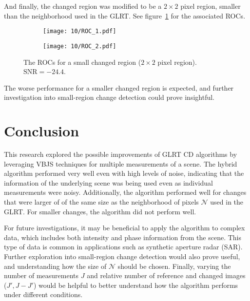 \documentclass{article}
\begin{document}
And finally, the changed region was modified to be a $2\times 2$ pixel region, smaller than the neighborhood used in the GLRT. See figure~\ref{fig:roc_10} for the associated ROCs.

\begin{figure}[H]
   \centering
   \begin{subfigure}{0.5\textwidth}
       \centering
       \texttt{[image: 10/ROC\_1.pdf]}
   \end{subfigure}%
   \begin{subfigure}{0.5\textwidth}
       \centering
       \texttt{[image: 10/ROC\_2.pdf]}
   \end{subfigure}%
   \caption{The ROCs for a small changed region ($2 \times 2$ pixel region). $\text{SNR} = -24.4$.}
   \label{fig:roc_10}
\end{figure}

The worse performance for a smaller changed region is expected, and further investigation into small-region change detection could prove insightful.


\section{Conclusion}

This research explored the possible improvements of GLRT CD algorithms by leveraging VBJS techniques for multiple measurements of a scene. The hybrid algorithm performed very well even with high levels of noise, indicating that the information of the underlying scene was being used even as individual measurements were noisy. Additionally, the algorithm performed well for changes that were larger of of the same size as the neighborhood of pixels $\mathcal{N}$ used in the GLRT. For smaller changes, the algorithm did not perform well.

For future investigations, it may be beneficial to apply the algorithm to complex data, which includes both intensity and phase information from the scene. This type of data is common in applications such as synthetic aperture radar (SAR). Further exploration into small-region change detection would also prove useful, and understanding how the size of $\mathcal{N}$ should be chosen.
Finally, varying the number of measurements $J$ and relative number of reference and changed images ($J', J-J'$) would be helpful to better understand how the algorithm performs under different conditions.
\end{document}
